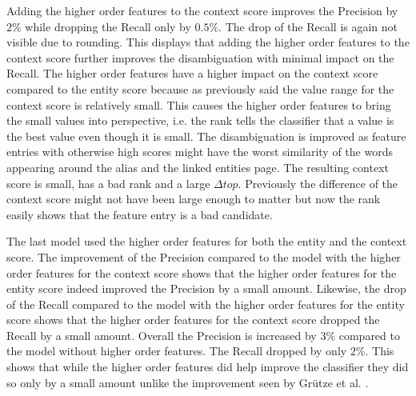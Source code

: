 Adding the higher order features to the context score improves the Precision by $2\%$ while dropping the Recall only by $0.5\%$. The drop of the Recall is again not visible due to rounding. This displays that adding the higher order features to the context score further improves the disambiguation with minimal impact on the Recall. The higher order features have a higher impact on the context score compared to the entity score because as previously said the value range for the context score is relatively small. This causes the higher order features to bring the small values into perspective, i.e. the rank tells the classifier that a value is the best value even though it is small. The disambiguation is improved as feature entries with otherwise high scores might have the worst similarity of the words appearing around the alias and the linked entities page. The resulting context score is small, has a bad rank and a large $\Delta top$. Previously the difference of the context score might not have been large enough to matter but now the rank easily shows that the feature entry is a bad candidate.\par
The last model used the higher order features for both the entity and the context score. The improvement of the Precision compared to the model with the higher order features for the context score shows that the higher order features for the entity score indeed improved the Precision by a small amount. Likewise, the drop of the Recall compared to the model with the higher order features for the entity score shows that the higher order features for the context score dropped the Recall by a small amount. Overall the Precision is increased by $3\%$ compared to the model without higher order features. The Recall dropped by only $2\%$. This shows that while the higher order features did help improve the classifier they did so only by a small amount unlike the improvement seen by Grütze et al. \cite{coheel}.\par
